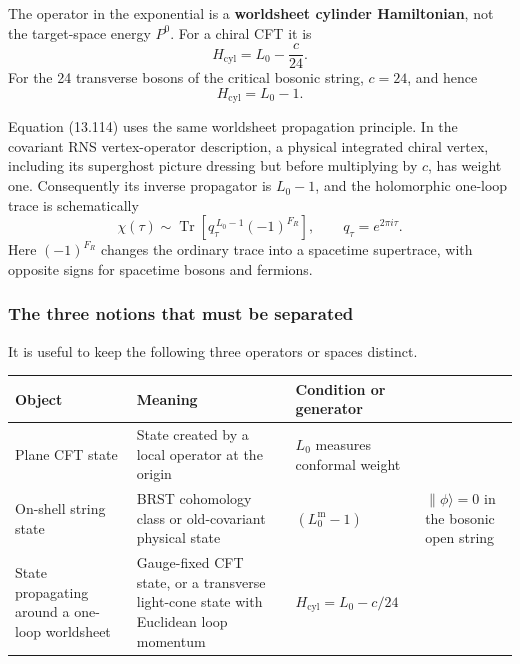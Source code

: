 \documentclass[
  10pt,
  a4paper,
  openany]{book}
\begin{document}
The operator in the exponential is a \textbf{worldsheet cylinder
Hamiltonian}, not the target-space energy \(P^0\). For a chiral CFT it
is \[
\boxed{
H_{\mathrm{cyl}}=L_0-\frac{c}{24}.
}
\] For the 24 transverse bosons of the critical bosonic string,
\(c=24\), and hence \[
H_{\mathrm{cyl}}=L_0-1.
\]

Equation (13.114) uses the same worldsheet propagation principle. In the
covariant RNS vertex-operator description, a physical integrated chiral
vertex, including its superghost picture dressing but before multiplying
by \(c\), has weight one. Consequently its inverse propagator is
\(L_0-1\), and the holomorphic one-loop trace is schematically \[
\boxed{
\chi(\tau)\sim
\operatorname{Tr}
\left[
q_\tau^{\,L_0-1}(-1)^{F_R}
\right],
\qquad
q_\tau=e^{2\pi i\tau}.
}
\] Here \((-1)^{F_R}\) changes the ordinary trace into a spacetime
supertrace, with opposite signs for spacetime bosons and fermions.

\subsubsection{The three notions that must be
separated}\label{the-three-notions-that-must-be-separated}

It is useful to keep the following three operators or spaces distinct.

\begin{longtable}[]{@{}
  >{\raggedright\arraybackslash}p{}
  >{\raggedright\arraybackslash}p{}
  >{\raggedright\arraybackslash}p{}
  >{\raggedright\arraybackslash}p{}@{}}
\toprule\noalign{}
\begin{minipage}[b]{\linewidth}\raggedright
Object
\end{minipage} & \begin{minipage}[b]{\linewidth}\raggedright
Meaning
\end{minipage} & \begin{minipage}[b]{\linewidth}\raggedright
Condition or generator
\end{minipage} & \begin{minipage}[b]{\linewidth}\raggedright
\end{minipage} \\
\midrule\noalign{}
\endhead
\bottomrule\noalign{}
\endlastfoot
Plane CFT state & State created by a local operator at the origin &
\(L_0\) measures conformal weight & \\
On-shell string state & BRST cohomology class or old-covariant physical
state & \((L_0^{\mathrm m}-1)\) & \(\|\phi\rangle=0\) in the bosonic
open string \\
State propagating around a one-loop worldsheet & Gauge-fixed CFT state,
or a transverse light-cone state with Euclidean loop momentum &
\(H_{\mathrm{cyl}}=L_0-c/24\) & \\
\end{longtable}
\end{document}
